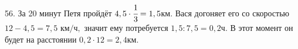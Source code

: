 56. За 20 минут Петя пройдёт $4,5\cdot\cfrac{1}{3}=1,5$км. Вася догоняет его со скоростью $12-4,5=7,5\text{ км/ч},$ значит ему потребуется $1,5:7,5=0,2$ч. В этот момент он будет на расстоянии $0,2\cdot12=2,4$км.\\
